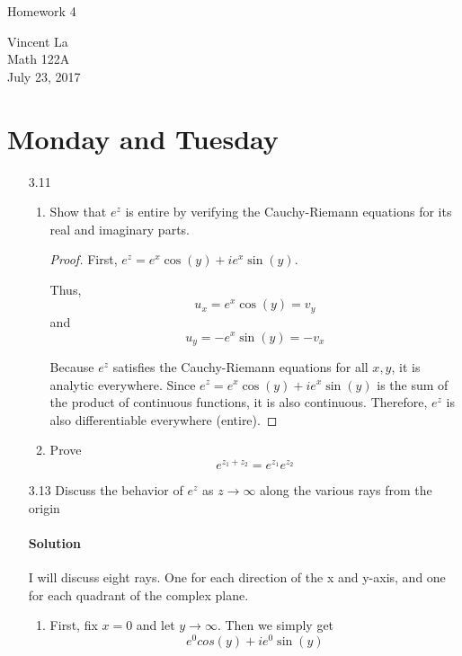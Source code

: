 \documentclass[11pt]{article}
\title{ }
\begin{document}
	\begin{center}	%
		\Large{Homework 4}	%
	\end{center}
	\begin{center}
		Vincent La \\
		Math 122A \\
		July 23, 2017
	\end{center}

\section{Monday and Tuesday}
\begin{enumerate}
	\item[3.11]
	\begin{enumerate}
		\item Show that $e^z$ is entire by verifying the Cauchy-Riemann equations for its real and imaginary parts.
		
		\begin{proof}
			First, $e^z = e^x \cos(y) + ie^x \sin(y)$.
			
			Thus,
			\[u_x = e^x \cos(y) = v_y \]
			and
			\[u_y = -e^x \sin(y) = -v_x \]
			
			Because $e^z$ satisfies the Cauchy-Riemann equations for all $x, y$, it is analytic everywhere. Since $e^z = e^x \cos(y) + ie^x \sin(y)$ is the sum of the product of continuous functions, it is also continuous. Therefore, $e^z$ is also differentiable everywhere (entire).
		\end{proof}
		
		\item Prove
			\[e^{z_1 + z_2} = e^{z_1}e^{z_2} \]
	\end{enumerate}
	
	\item[3.13] Discuss the behavior of $e^z$ as $z \rightarrow \infty$ along the various rays from the origin
	
	\paragraph{Solution} I will discuss eight rays. One for each direction of the x and y-axis, and one for each quadrant of the complex plane.
	
	\begin{enumerate}
		\item First, fix $x = 0$ and let $y \rightarrow \infty$. Then we simply get
		\[e^0cos(y) + ie^0\sin(y) \]
		

\end{enumerate}
\end{enumerate}
\end{document}
